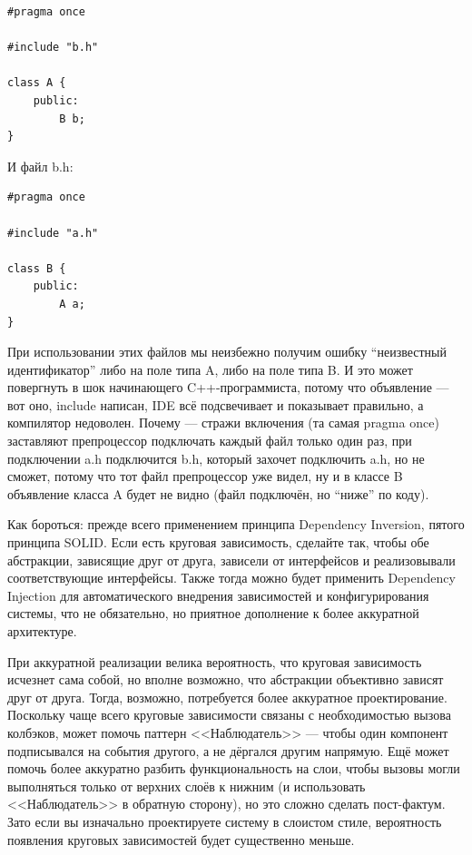\documentclass{../../text-style}
\begin{document}
\begin{verbatim}
#pragma once

#include "b.h"

class A {
    public:
        B b;
}
\end{verbatim}

И файл b.h:

\begin{verbatim}
#pragma once

#include "a.h"

class B {
    public:
        A a;
}
\end{verbatim}

При использовании этих файлов мы неизбежно получим ошибку ``неизвестный идентификатор'' либо на поле типа A, либо на поле типа B. И это может повергнуть в шок начинающего C++-программиста, потому что объявление --- вот оно, include написан, IDE всё подсвечивает и показывает правильно, а компилятор недоволен. Почему --- стражи включения (та самая pragma once) заставляют препроцессор подключать каждый файл только один раз, при подключении a.h подключится b.h, который захочет подключить a.h, но не сможет, потому что тот файл препроцессор уже видел, ну и в классе B объявление класса A будет не видно (файл подключён, но ``ниже'' по коду).

Как бороться: прежде всего применением принципа Dependency Inversion, пятого принципа SOLID. Если есть круговая зависимость, сделайте так, чтобы обе абстракции, зависящие друг от друга, зависели от интерфейсов и реализовывали соответствующие интерфейсы. Также тогда можно будет применить Dependency Injection для автоматического внедрения зависимостей и конфигурирования системы, что не обязательно, но приятное дополнение к более аккуратной архитектуре.

При аккуратной реализации велика вероятность, что круговая зависимость исчезнет сама собой, но вполне возможно, что абстракции объективно зависят друг от друга. Тогда, возможно, потребуется более аккуратное проектирование. Поскольку чаще всего круговые зависимости связаны с необходимостью вызова колбэков, может помочь паттерн <<Наблюдатель>> --- чтобы один компонент подписывался на события другого, а не дёргался другим напрямую. Ещё может помочь более аккуратно разбить функциональность на слои, чтобы вызовы могли выполняться только от верхних слоёв к нижним (и использовать <<Наблюдатель>> в обратную сторону), но это сложно сделать пост-фактум. Зато если вы изначально проектируете систему в слоистом стиле, вероятность появления круговых зависимостей будет существенно меньше.
\end{document}
